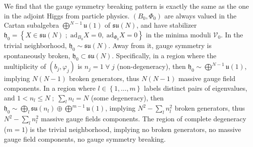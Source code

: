 \documentclass[../main.tex]{subfiles}
\begin{document}
We find that the gauge symmetry breaking pattern is exactly the same as the one in the adjoint Higgs from particle physics. $(B_0, \Phi_0)$ are always valued in the Cartan subalgebra $\bigoplus^{N-1} \mathfrak{u}(1)$ of $\mathfrak{su}(N)$, and have stabilizer $\mathfrak{h}_0 = \left\{ X \in \mathfrak{su}(N) \; ; \; \mathrm{ad}_{B_0} X = 0, \;\mathrm{ad}_{\Phi_0} X = 0\right\} $ in the minima moduli $\mathcal{V}_0$. In the trivial neighborhood, $\mathfrak{h}_0 \sim \mathfrak{su}(N)$. Away from it, gauge symmetry is spontaneously broken, $\mathfrak{h}_0 \subset \mathfrak{su}(N)$. Specifically, in a region where the multiplicity of $(b_j, \varphi_j)$ is $n_j=1 \; \forall \; j$ (non-degeneracy), then $\mathfrak{h}_0 \sim \bigoplus^{N-1} \mathfrak{u}(1)$, implying $N(N - 1)$ broken generators, thus $N(N-1)$ massive gauge field components. In a region where $l \in \left\{1, \ldots, m\right\} $ labels distinct pairs of eigenvalues, and $1 < n_l \leq N \; ; \; \sum_l n_l = N$ (some degeneracy), then $\mathfrak{h}_0 \sim \bigoplus_l \mathfrak{su}(n_l) \oplus \bigoplus^{m-1} \mathfrak{u}(1)$, implying $N^2 - \sum_l n_l^2$ broken generators, thus $N^2 - \sum_l n_l^2$ massive gauge fields components. The region of complete degeneracy ($m=1$) is the trivial neighborhood, implying no broken generators, no massive gauge field components, no gauge symmetry breaking.
\end{document}

